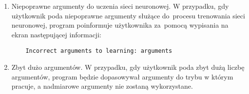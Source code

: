 \documentclass[a4paper]{article}
\begin{document}
\begin{enumerate}
    \newpage
    \item Niepoprawne argumenty do uczenia sieci neuronowej.
    \newline
    W przypadku, gdy użytkownik poda niepoprawne argumenty służące do~procesu trenowania sieci neuronowej, program poinformuje użytkownika za~pomocą wypisania na ekran następującej informacji:
    \begin{verbatim}    Incorrect arguments to learning: arguments\end{verbatim}
    \item Zbyt dużo argumentów.
    \newline
    W przypadku, gdy użytkownik poda zbyt dużą liczbę argumentów, program będzie dopasowywał argumenty do trybu w którym pracuje, a nadmiarowe argumenty nie zostaną wykorzystane.
\end{enumerate}

\label{end}
\end{document}
